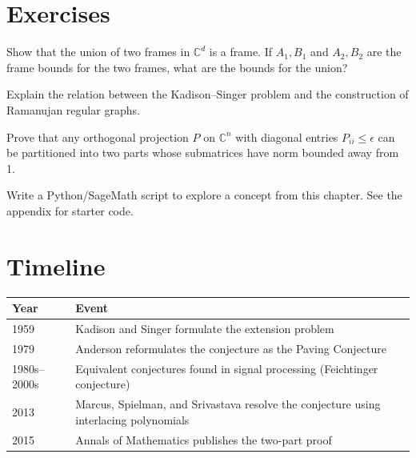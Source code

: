 \section{Exercises}

\begin{exercise}[Basic]
Show that the union of two frames in $\mathbb{C}^d$ is a frame. If $A_1, B_1$ and $A_2, B_2$ are the frame bounds for the two frames, what are the bounds for the union?
\end{exercise}

\begin{exercise}[Intermediate]
Explain the relation between the Kadison--Singer problem and the construction of Ramanujan regular graphs.
\end{exercise}

\begin{exercise}[Challenge]
Prove that any orthogonal projection $P$ on $\mathbb{C}^n$ with diagonal entries $P_{ii} \leq \epsilon$ can be partitioned into two parts whose submatrices have norm bounded away from 1.
\end{exercise}

\begin{exercise}[Computational]
Write a Python/SageMath script to explore a concept from this chapter. See the appendix for starter code.
\end{exercise}

\section{Timeline}

\begin{tabularx}{\linewidth}{lX}
\toprule
\textbf{Year} & \textbf{Event} \\ \midrule
1959 & Kadison and Singer formulate the extension problem \cite{kadison1959} \\ 
1979 & Anderson reformulates the conjecture as the Paving Conjecture \cite{anderson1979} \\ 
1980s--2000s & Equivalent conjectures found in signal processing (Feichtinger conjecture) \\ 
2013 & Marcus, Spielman, and Srivastava resolve the conjecture using interlacing polynomials \cite{marcus2015a, marcus2015b} \\ 
2015 & Annals of Mathematics publishes the two-part proof \\ \bottomrule
\end{tabularx}

